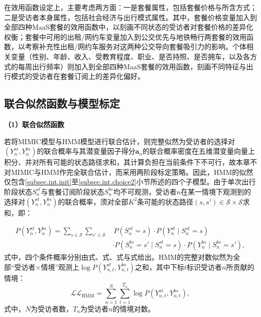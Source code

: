 在效用函数设定上，主要考虑两方面：一是套餐属性，包括套餐价格与所含方式；二是受访者本身属性，包括社会经济与出行模式属性。其中，套餐价格变量加入到全部四种MaaS套餐的效用函数中，以刻画不同状态的受访者对套餐价格的差异化权衡；套餐中可用的出租/网约车变量加入到公交优先与地铁畅行两套餐的效用函数，以考察补充性出租/网约车服务对这两种公交导向套餐吸引力的影响。个体相关变量（性别、年龄、收入、受教育程度、职业、是否持照、是否拥车，以及各方式的每周出行频率）则加入到全部四种MaaS套餐的效用函数，刻画不同特征与出行模式的受访者在套餐订阅上的差异化偏好。

\subsection{联合似然函数与模型标定}\label{subsec.int.joint}

\textbf{（1）联合似然函数}

若将MIMIC模型与HMM模型进行联合估计，则完整似然为受访者的选择对$(Y_{n}^{st},Y_{n}^{bs})$的联合概率与其潜变量因子得分$\boldsymbol{a}_n$的联合概率密度在五维潜变量向量上积分、并对所有可能的状态路径求和，其计算负担在当前条件下不可行，故本章不对MIMIC与HMM作完全联合估计，而采用两阶段标定策略。因此，HMM的似然仅包含\ref{subsec.int.init}至\ref{subsec.int.choice2}小节所述的四个子模型。由于单次出行阶段状态$S_n^{st}$与套餐订阅阶段状态$S_n^{bs}$均不可观测，受访者$n$在某一情境下观测到的选择对$(Y_{n}^{st},Y_{n}^{bs})$的联合概率，须对全部$K^2$条可能的状态路径$(s,s')\in\mathcal{S}\times\mathcal{S}$求和，即：

\begin{equation}\label{eq.int.joint}
\begin{aligned}
P\!\left(Y_{n}^{st},Y_{n}^{bs}\right)=\sum_{s\in\mathcal{S}}\sum_{s'\in\mathcal{S}}
& \, P\!\left(S_n^{st}=s\right)\cdot P\!\left(Y_{n}^{st}\mid S_n^{st}=s\right)\\
& \cdot P\!\left(S_n^{bs}=s'\mid S_n^{st}=s\right)\cdot P\!\left(Y_{n}^{bs}\mid S_n^{bs}=s'\right),
\end{aligned}
\end{equation}
式中，四个条件概率分别由式、式、式与式给出。HMM的完整对数似然为全部``受访者$\times$情境''观测上$\log P(Y_{n,t}^{st},Y_{n,t}^{bs})$之和，其中下标$t$标识受访者$n$所贡献的情境：
\begin{equation}\label{eq.int.loglik}
\mathcal{LL}_{\mathrm{HMM}}=\sum_{n=1}^{N}\sum_{t=1}^{T_n}\log P\!\left(Y_{n,t}^{st},Y_{n,t}^{bs}\right),
\end{equation}
式中，$N$为受访者数，$T_n$为受访者$n$的情境对数。

